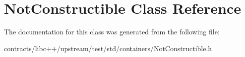 \hypertarget{class_not_constructible}{}\section{Not\+Constructible Class Reference}
\label{class_not_constructible}


The documentation for this class was generated from the following file\+:\begin{DoxyCompactItemize}
\item 
contracts/libc++/upstream/test/std/containers/Not\+Constructible.\+h\end{DoxyCompactItemize}

